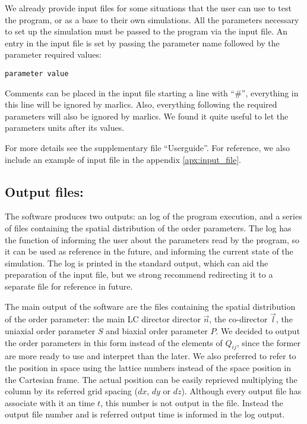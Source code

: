\documentclass[final,5p,times,twocolumn]{elsarticle}
\begin{document}
We already provide input files for some situations that the user can
use to test the program, or as a base to their own simulations. All
the parameters necessary to set up the simulation must be passed to
the program via the input file. An entry in the input file is set by passing the parameter name
followed by the parameter required values:
\begin{lstlisting}
parameter value
\end{lstlisting}

Comments can be placed in the input file starting a line with ``\#'',
everything in this line will be ignored by marlics. Also, everything
following the required parameters will also be ignored by marlics. We
found it quite useful to let the parameters units after its values.

For more details see the
supplementary file ``Userguide''.
For reference, we also include an
example of input file in the appendix \ref{apx:input_file}.

\subsection{Output files:}

The software produces two outputs: an log of the program execution,
and a series of files containing the spatial distribution of the order
parameters. The log has the function of informing the user about the
parameters read by the program, so it can be used as reference in the
future, and informing the current state of the simulation. The log is
printed in the standard output, which can aid the preparation of the
input file, but we strong recommend redirecting it to a separate file
for reference in future.


The main output of the software are the files containing the spatial
distribution of the order parameter: the main LC director director
$\vec{n}$, the co-director $\vec{l}$, the uniaxial order parameter $S$
and biaxial order parameter $P$. We decided to output the order
parameters in this form instead of the elements of $Q_{ij}$, since the
former are more ready to use and interpret than the later.  We also
preferred to refer to the position in space using the lattice numbers
instead of the space position in the Cartesian frame. The actual
position can be easily reprieved multiplying the column by its
referred grid spacing ($dx$, $dy$ or $dz$). Although every output file
has associate with it an time $t$, this number is not output in the
file. Instead the output file number and is referred output time is
informed in the log output. 
\end{document}
